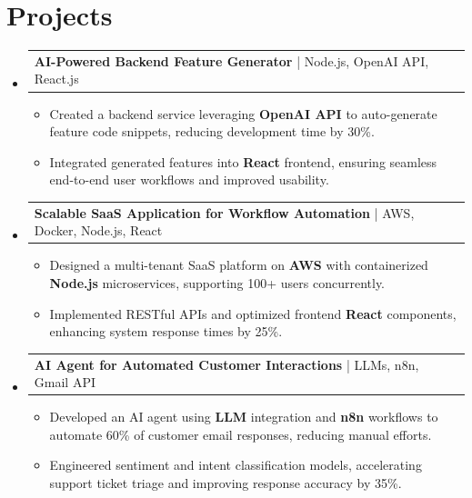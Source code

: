 \documentclass[letterpaper,11pt]{article}
\makeatletter
\newcommand{\resumeItem}[1]{
  \item\footnotesize{
    {#1 \vspace{-2pt}}
  }
}
\newcommand{\resumeProjectHeading}[2]{
    \item
    \begin{tabular*}{1.001\textwidth}{l@{\extracolsep{\fill}}r}
      \small#1 & \textbf{\small #2}\\
    \end{tabular*}\vspace{-7pt}
}
\newcommand{\resumeSubHeadingListStart}{\begin{itemize}[leftmargin=0pt, label={}]}
\newcommand{\resumeSubHeadingListEnd}{\end{itemize}}
\newcommand{\resumeItemListStart}{\begin{itemize}[leftmargin=*]}
\newcommand{\resumeItemListEnd}{\end{itemize}\vspace{-5pt}}
\makeatother
\begin{document}
\section{Projects}
    \vspace{-5pt}
    \resumeSubHeadingListStart
      \resumeProjectHeading
          {\textbf{AI-Powered Backend Feature Generator} | Node.js, OpenAI API, React.js}{}
          \resumeItemListStart
              \resumeItem{Created a backend service leveraging \textbf{OpenAI API} to auto-generate feature code snippets, reducing development time by 30\%.}
              \resumeItem{Integrated generated features into \textbf{React} frontend, ensuring seamless end-to-end user workflows and improved usability.}
          \resumeItemListEnd
          \vspace{-12pt}
      \resumeProjectHeading
          {\textbf{Scalable SaaS Application for Workflow Automation} | AWS, Docker, Node.js, React}{}
          \resumeItemListStart
              \resumeItem{Designed a multi-tenant SaaS platform on \textbf{AWS} with containerized \textbf{Node.js} microservices, supporting 100+ users concurrently.}
              \resumeItem{Implemented RESTful APIs and optimized frontend \textbf{React} components, enhancing system response times by 25\%.}
          \resumeItemListEnd
          \vspace{-12pt}
      \resumeProjectHeading
          {\textbf{AI Agent for Automated Customer Interactions} | LLMs, n8n, Gmail API}{}
          \resumeItemListStart
              \resumeItem{Developed an AI agent using \textbf{LLM} integration and \textbf{n8n} workflows to automate 60\% of customer email responses, reducing manual efforts.}
              \resumeItem{Engineered sentiment and intent classification models, accelerating support ticket triage and improving response accuracy by 35\%.}
          \resumeItemListEnd
    \resumeSubHeadingListEnd
\end{document}

